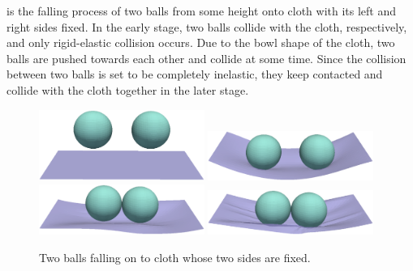  is the falling process of two balls from some height
onto cloth with its left and right sides fixed.
In the early stage, two balls collide with the cloth, respectively, and
only rigid-elastic collision occurs.
Due to the bowl shape of the cloth, two balls are pushed towards each other
and collide at some time.
Since the collision between two balls is set to be completely inelastic,
they keep contacted and collide with the cloth together in the later stage.
\begin{figure}[!ht]
\centering
\includegraphics[width=0.48\textwidth]{figures/2sphere_fall_0}
\includegraphics[width=0.48\textwidth]{figures/2sphere_fall_1} \\
\includegraphics[width=0.48\textwidth]{figures/2sphere_fall_2}
\includegraphics[width=0.48\textwidth]{figures/2sphere_fall_3}
\caption{Two balls falling on to cloth whose two sides are fixed. }
\label{fig:2sphere_fall}
\end{figure}



\newpage
